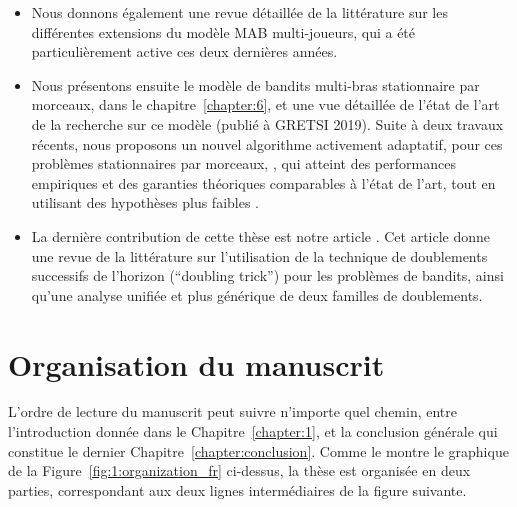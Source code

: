 \begin{resume_fr}
\begin{itemize}
    \item
    Nous donnons également une revue détaillée de la littérature sur les différentes extensions du modèle MAB multi-joueurs, qui a été particulièrement active ces deux dernières années.

    \item
    Nous présentons ensuite le modèle de bandits multi-bras stationnaire par morceaux, dans le chapitre~\ref{chapter:6}, et une vue détaillée de l'état de l'art de la recherche sur ce modèle \cite{Besson2019GLRT,Besson2019Gretsi} (publié à GRETSI 2019).
    Suite à deux travaux récents, nous proposons un nouvel algorithme activement adaptatif, pour ces problèmes stationnaires par morceaux, \GLRklUCB, qui atteint des performances empiriques et des garanties théoriques comparables à l'état de l'art, tout en utilisant des hypothèses plus faibles .

    \item
    La dernière contribution de cette thèse est notre article \cite{Besson2018DoublingTricks}.
    Cet article donne une revue de la littérature sur l'utilisation de la technique de doublements successifs de l'horizon (``doubling trick'') pour les problèmes de bandits,
    ainsi qu'une analyse unifiée et plus générique de deux familles de doublements.
\end{itemize}

\section*{Organisation du manuscrit}

%
L'ordre de lecture du manuscrit peut suivre n'importe quel chemin, entre l'introduction donnée dans le Chapitre~\ref{chapter:1}, et la conclusion générale qui constitue le dernier Chapitre~\ref{chapter:conclusion}.
Comme le montre le graphique de la Figure~\ref{fig:1:organization_fr} ci-dessus,
la thèse est organisée en deux parties, correspondant aux deux lignes intermédiaires de la figure suivante.


\end{resume_fr}
